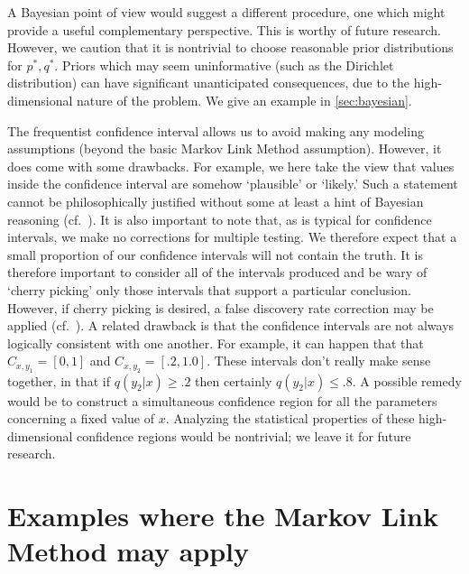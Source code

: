 A Bayesian point of view would suggest a different procedure, one which might provide a useful complementary perspective.  This is worthy of future research.  However, we caution that it is nontrivial to choose reasonable prior distributions for $p^*,q^*$.  Priors which may seem uninformative (such as the Dirichlet distribution) can have significant unanticipated consequences, due to the high-dimensional nature of the problem.  We give an example in \ref{sec:bayesian}.  

The frequentist confidence interval allows us to avoid making any modeling assumptions (beyond the basic Markov Link Method assumption).  However, it does come with some drawbacks.   For example, we here take the view that values inside the confidence interval are somehow `plausible' or `likely.'  Such a statement cannot be philosophically justified without some at least a hint of Bayesian reasoning (cf.\ \cite{morey2016fallacy}).  It is also important to note that, as is typical for confidence intervals, we make no corrections for multiple testing.  We therefore expect that a small proportion of our confidence intervals will not contain the truth.   It is therefore important to consider all of the intervals produced and be wary of `cherry picking' only those intervals that support a particular conclusion.  However, if cherry picking is desired, a false discovery rate correction may be applied (cf.\ \cite{benjamini2005false}).  A related drawback is that the confidence intervals are not always logically consistent with one another.  For example, it can happen that that $C_{x,y_1}=[0,1]$ and $C_{x,y_2}=[.2,1.0]$.  These intervals don't really make sense together, in that if $q(y_2|x)\geq .2$ then certainly $q(y_2|x)\leq .8$.  A possible remedy would be to construct a simultaneous confidence region for all the parameters concerning a fixed value of $x$.  Analyzing the statistical properties of these high-dimensional confidence regions would be nontrivial; we leave it for future research.



\section{Examples where the Markov Link Method may apply}

